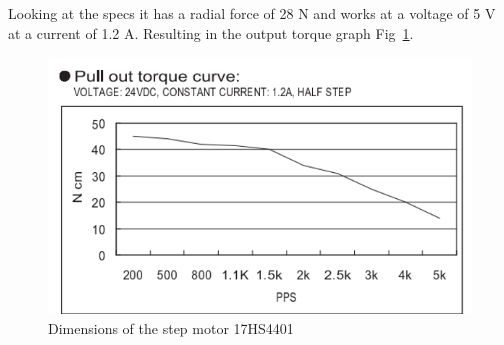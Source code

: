\documentclass[runningheads]{llncs}
\begin{document}
Looking at the specs it has a radial force of 28 N and works at a voltage of 5 V at a current of 1.2 A. Resulting in the output torque graph Fig~\ref{fig:PullOutTorque}.

\begin{figure}[!h]
    \centering
    \caption{Dimensions of the step motor 17HS4401 }\label{fig:PullOutTorque}
    \includegraphics[scale = 0.7]{PullOutTorque.png}
\end{figure}





 
\end{document}

